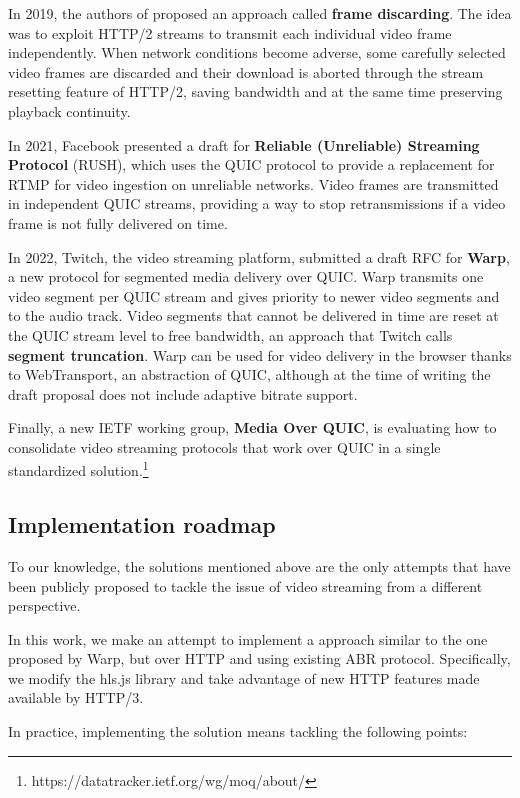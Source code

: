 In 2019, the authors of \cite{framediscarding} proposed an approach called \textbf{frame discarding}. The idea was to exploit HTTP/2 streams to transmit each individual video frame independently. When network conditions become adverse, some carefully selected video frames are discarded and their download is aborted through the stream resetting feature of HTTP/2, saving bandwidth and at the same time preserving playback continuity.

In 2021, Facebook presented a draft for \textbf{Reliable (Unreliable) Streaming Protocol} (RUSH), which uses the QUIC protocol to provide a replacement for RTMP for video ingestion on unreliable networks. Video frames are transmitted in independent QUIC streams, providing a way to stop retransmissions if a video frame is not fully delivered on time.\cite{rush}

In 2022, Twitch, the video streaming platform, submitted a draft RFC for \textbf{Warp}, a new protocol for segmented media delivery over QUIC. Warp transmits one video segment per QUIC stream and gives priority to newer video segments and to the audio track. Video segments that cannot be delivered in time are reset at the QUIC stream level to free bandwidth, an approach that Twitch calls \textbf{segment truncation}. Warp can be used for video delivery in the browser thanks to WebTransport, an abstraction of QUIC, although at the time of writing the draft proposal does not include adaptive bitrate support.\cite{warp}

Finally, a new IETF working group, \textbf{Media Over QUIC}, is evaluating how to consolidate video streaming protocols that work over QUIC in a single standardized solution.\footnote{https://datatracker.ietf.org/wg/moq/about/}

\subsection{Implementation roadmap}
\label{sec:improvements/ux/roadmap}

To our knowledge, the solutions mentioned above are the only attempts that have been publicly proposed to tackle the issue of video streaming from a different perspective.

In this work, we make an attempt to implement a approach similar to the one proposed by Warp, but over HTTP and using existing ABR protocol. Specifically, we modify the hls.js library and take advantage of new HTTP features made available by HTTP/3.

In practice, implementing the solution means tackling the following points:

